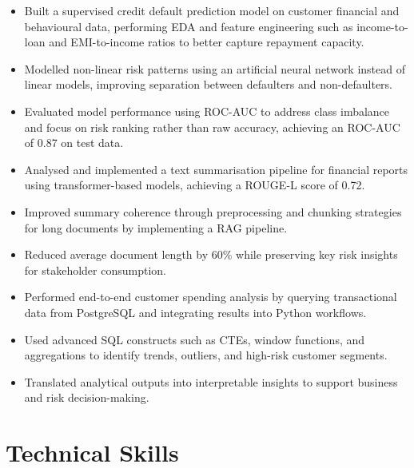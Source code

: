 \documentclass{resume}
\begin{document}
\begin{itemize}
  \item Built a supervised credit default prediction model on customer financial and behavioural data, performing EDA and feature engineering such as income-to-loan and EMI-to-income ratios to better capture repayment capacity.
  \item Modelled non-linear risk patterns using an artificial neural network instead of linear models, improving separation between defaulters and non-defaulters.
  \item Evaluated model performance using ROC-AUC to address class imbalance and focus on risk ranking rather than raw accuracy, achieving an ROC-AUC of 0.87 on test data.
\end{itemize}

\begin{itemize}
  \item Analysed and implemented a text summarisation pipeline for financial reports using transformer-based models, achieving a ROUGE-L score of 0.72.
  \item Improved summary coherence through preprocessing and chunking strategies for long documents by implementing a RAG pipeline.
  \item Reduced average document length by 60\% while preserving key risk insights for stakeholder consumption.
\end{itemize}

\begin{itemize}
  \item Performed end-to-end customer spending analysis by querying transactional data from PostgreSQL and integrating results into Python workflows.
  \item Used advanced SQL constructs such as CTEs, window functions, and aggregations to identify trends, outliers, and high-risk customer segments.
  \item Translated analytical outputs into interpretable insights to support business and risk decision-making.
\end{itemize}

\section{Technical Skills}
\begin{itemize}
\end{itemize}
\end{document}
